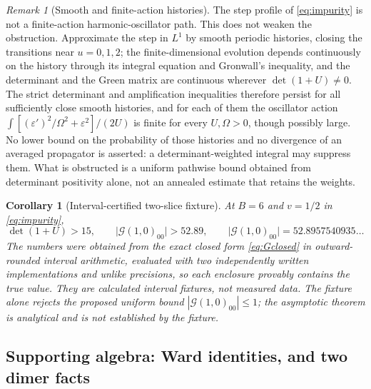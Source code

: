 \documentclass[11pt]{article}
\newtheorem{corollary}[theorem]{Corollary}
\theoremstyle{definition}
\theoremstyle{remark}
\newtheorem{remark}[theorem]{Remark}
\newcommand{\Ggreen}{\mathcal{G}}
\begin{document}
\begin{remark}[Smooth and finite-action histories]
\label{rem:smooth}
The step profile of \eqref{eq:impurity} is not a finite-action harmonic-oscillator
path. This does not weaken the obstruction. Approximate the step in $L^1$ by smooth
periodic histories, closing the transitions near $u=0,1,2$; the finite-dimensional
evolution depends continuously on the history through its integral equation and
Gronwall's inequality, and the determinant and the Green matrix are continuous
wherever $\det(1+U)\ne0$. The strict determinant and amplification inequalities
therefore persist for all sufficiently close smooth histories, and for each of them
the oscillator action $\int[(\varepsilon')^2/\Omega^2+\varepsilon^2]/(2U)$ is finite for every
$U,\Omega>0$, though possibly large. No lower bound on the probability of those
histories and no divergence of an averaged propagator is asserted: a
determinant-weighted integral may suppress them. What is obstructed is a uniform
pathwise bound obtained from determinant positivity alone, not an annealed estimate
that retains the weights.
\end{remark}

\begin{corollary}[Interval-certified two-slice fixture]
\label{cor:fixture}
At $B=6$ and $v=1/2$ in \eqref{eq:impurity},
\begin{equation}
\det(1+U)>15,\qquad \bigl|\Ggreen(1,0)_{00}\bigr|>52.89,
\qquad \bigl|\Ggreen(1,0)_{00}\bigr|=52.8957540935\ldots
\label{eq:fixture}
\end{equation}
The numbers were obtained from the exact closed form \eqref{eq:Gclosed} in
outward-rounded interval arithmetic, evaluated with two independently written
implementations and unlike precisions, so each enclosure provably contains the true
value. They are calculated interval fixtures, not measured data. The fixture alone
rejects the proposed uniform bound $|\Ggreen(1,0)_{00}|\le1$; the asymptotic theorem
is analytical and is not established by the fixture.
\end{corollary}

\subsection{Supporting algebra: Ward identities, and two dimer facts}
\end{document}
